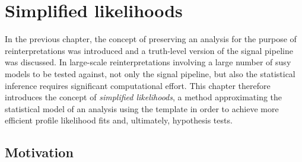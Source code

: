 


\chapter{Simplified likelihoods}\label{ch:simplify}

\graphicspath{{chapter-simplify/Figs/Vector/}{chapter-simplify/Figs/}}

In the previous chapter, the concept of preserving an analysis for the purpose of reinterpretations was introduced and a truth-level version of the signal pipeline was discussed. In large-scale reinterpretations involving a large number of \gls{susy} models to be tested against, not only the signal pipeline, but also the statistical inference requires significant computational effort. 
This chapter therefore introduces the concept of \textit{simplified likelihoods}, a method approximating the statistical model of an analysis using the  template in order to achieve more efficient profile likelihood fits and, ultimately, hypothesis tests.

\section{Motivation}\label{sec:simplified_likelihood_motivation}

